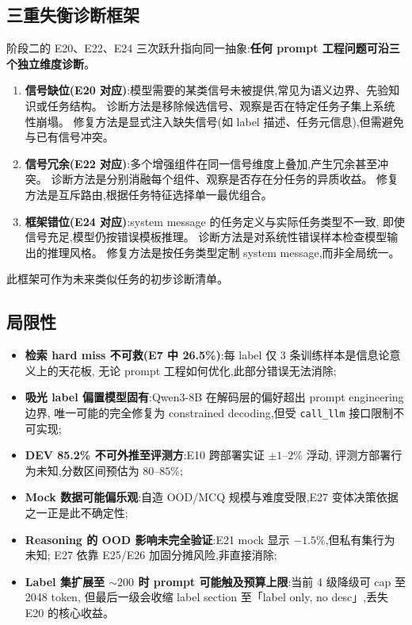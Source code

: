 \documentclass[11pt,a4paper]{ctexart}
\begin{document}
\subsection{三重失衡诊断框架}

阶段二的 E20、E22、E24 三次跃升指向同一抽象:\textbf{任何 prompt 工程问题可沿三个独立维度诊断}。

\begin{enumerate}[leftmargin=2em,itemsep=0.15em]
\item \textbf{信号缺位(E20 对应)}:模型需要的某类信号未被提供,常见为语义边界、先验知识或任务结构。
  诊断方法是移除候选信号、观察是否在特定任务子集上系统性崩塌。
  修复方法是显式注入缺失信号(如 label 描述、任务元信息),但需避免与已有信号冲突。
\item \textbf{信号冗余(E22 对应)}:多个增强组件在同一信号维度上叠加,产生冗余甚至冲突。
  诊断方法是分别消融每个组件、观察是否存在分任务的异质收益。
  修复方法是互斥路由,根据任务特征选择单一最优组合。
\item \textbf{框架错位(E24 对应)}:system message 的任务定义与实际任务类型不一致,
  即使信号充足,模型仍按错误模板推理。
  诊断方法是对系统性错误样本检查模型输出的推理风格。
  修复方法是按任务类型定制 system message,而非全局统一。
\end{enumerate}

\noindent 此框架可作为未来类似任务的初步诊断清单。

\subsection{局限性}

\begin{itemize}[leftmargin=2em,itemsep=0.1em]
\item \textbf{检索 hard miss 不可救(E7 中 26.5\%)}:每 label 仅 3 条训练样本是信息论意义上的天花板,
  无论 prompt 工程如何优化,此部分错误无法消除;
\item \textbf{吸光 label 偏置模型固有}:Qwen3-8B 在解码层的偏好超出 prompt engineering 边界,
  唯一可能的完全修复为 constrained decoding,但受 \texttt{call\_llm} 接口限制不可实现;
\item \textbf{DEV 85.2\% 不可外推至评测方}:E10 跨部署实证 $\pm 1$--$2\%$ 浮动,
  评测方部署行为未知,分数区间预估为 $80$--$85\%$;
\item \textbf{Mock 数据可能偏乐观}:自造 OOD/MCQ 规模与难度受限,E27 变体决策依据之一正是此不确定性;
\item \textbf{Reasoning 的 OOD 影响未完全验证}:E21 mock 显示 $-1.5\%$,但私有集行为未知;
  E27 依靠 E25/E26 加固分摊风险,非直接消除;
\item \textbf{Label 集扩展至 $\sim 200$ 时 prompt 可能触及预算上限}:当前 4 级降级可 cap 至 2048 token,
  但最后一级会收缩 label section 至「label only, no desc」,丢失 E20 的核心收益。
\end{itemize}
\end{document}
